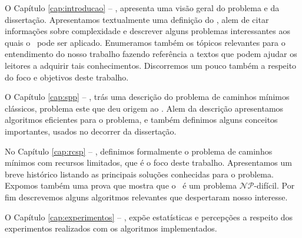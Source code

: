 O Capítulo \ref{cap:introducao} -- , apresenta 
uma visão geral do problema e da dissertação. Apresentamos textualmente 
uma definição do \rcsp, alem de citar informações sobre complexidade e 
descrever alguns problemas interessantes aos quais o \rcsp~pode ser 
aplicado. Enumeramos também os tópicos relevantes para o entendimento do 
nosso trabalho fazendo referência a textos que podem ajudar os leitores 
a adquirir tais conhecimentos. Discorremos um pouco também a respeito do 
foco e objetivos deste trabalho.

O Capítulo \ref{cap:spp} -- , trás uma descrição do 
problema de caminhos mínimos clássicos, problema este que deu origem ao 
\rcsp. Alem da descrição apresentamos algoritmos eficientes para o 
problema, e também definimos alguns conceitos importantes, usados no 
decorrer da dissertação.

No Capítulo \ref{cap:rcsp} -- , definimos formalmente 
o problema de caminhos mínimos com recursos limitados, que é o foco 
deste trabalho. Apresentamos um breve histórico listando as principais 
soluções conhecidas para o problema. Expomos também uma prova que mostra 
que o \rcsp~é um problema $\mathcal{NP}$-difícil. Por fim descrevemos 
alguns algoritmos relevantes que despertaram nosso interesse.

O Capítulo \ref{cap:experimentos} -- , expõe 
estatísticas e percepções a respeito dos experimentos realizados com os 
algoritmos implementados.

